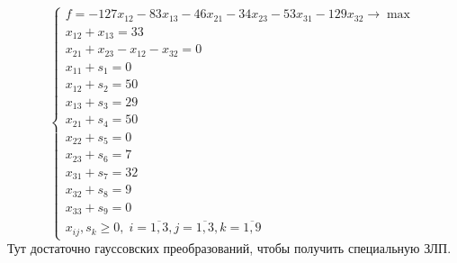 \documentclass[a4paper]{article}
\theoremstyle{definition}
\theoremstyle{remark}
\begin{document}
\[\begin{cases}
		f = -127 x_{12} - 83 x_{13} - 46 x_{21} - 34 x_{23} - 53 x_{31} - 129 x_{32} \to \max \\
		x_{12}+x_{13} = 33                                                                    \\
		x_{21} + x_{23} - x_{12} - x_{32} = 0                                                 \\
		x_{11} + s_{1} =  0                                                                   \\
		x_{12} + s_{2} =  50                                                                  \\
		x_{13} + s_{3} =  29                                                                  \\
		x_{21} + s_{4} =  50                                                                  \\
		x_{22} + s_{5} =  0                                                                   \\
		x_{23} + s_{6} =  7                                                                   \\
		x_{31} + s_{7} =  32                                                                  \\
		x_{32} + s_{8} =  9                                                                   \\
		x_{33} + s_{9} =  0                                                                   \\
		x_{ij}, s_k \geqslant 0, \; i = \overline{1, 3}, j = \overline{1, 3}, k = \overline{1, 9}
	\end{cases}\]
Тут достаточно гауссовских преобразований, чтобы получить специальную ЗЛП.
\end{document}
